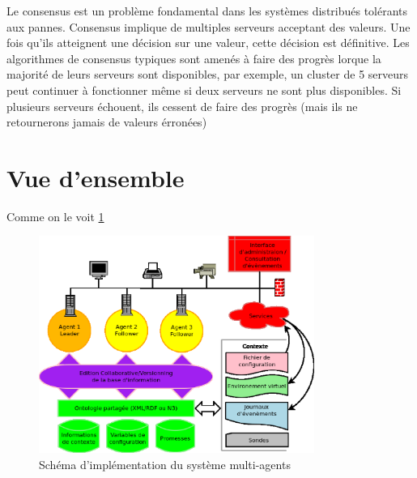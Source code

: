 Le consensus est un problème fondamental dans les systèmes distribués tolérants
aux pannes. Consensus implique de multiples serveurs acceptant des valeurs. Une
fois qu'ils atteignent une décision sur une valeur, cette décision est
définitive. Les algorithmes de consensus typiques  sont amenés à faire des
progrès lorque la majorité de leurs serveurs sont disponibles, par exemple, un
cluster de 5 serveurs peut continuer à fonctionner même si deux serveurs ne sont
plus disponibles. Si plusieurs serveurs échouent, ils cessent de faire des
progrès (mais ils ne retournerons jamais de valeurs érronées)

\section{Vue d'ensemble}

Comme on le voit \ref{archi}

\begin{figure}[ht!]
  \centering
  \includegraphics[width=90mm]{img/archi}
  \caption{Schéma d'implémentation du système multi-agents}
  \label{archi}
\end{figure}

